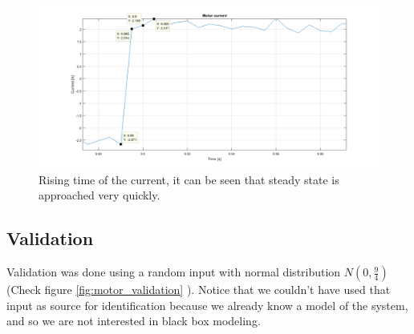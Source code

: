 \begin{figure}[!h]
    \centering
    \includegraphics[width=1\textwidth]{img/motor_id_2.png}
    \caption{Rising time of the current, it can be seen that steady state is approached very quickly.}
    \label{fig:motor_id_2}
\end{figure}
\subsection{Validation}
Validation was done using a random input with normal distribution $N(0,\frac{9}{4})$ (Check figure \ref{fig:motor_validation} ). Notice that we couldn't have used that input as source for identification because we already know a model of the system, and so we are not interested in black box modeling. 

